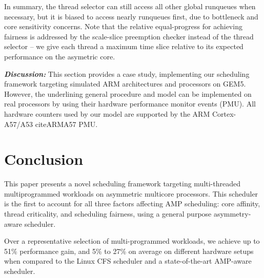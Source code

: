 \documentclass{sig-alternate}
\begin{document}
In summary, the thread selector can still access all other global runqueues when necessary, but it is biased to access nearly runqueues first, due to bottleneck and core sensitivity concerns. 
Note that the relative equal-progress for achieving fairness is addressed by the scale-slice preemption checker instead of the thread selector -- we give each thread a maximum time slice relative to its expected performance on the asymetric core.

\textbf{\textit{Discussion:}}
This section provides a case study, implementing our scheduling framework targeting simulated ARM architectures and processors on GEM5.  However, the underlining general procedure and model can be implemented on real processors by using their hardware performance monitor events (PMU). All hardware counters used by our model are supported by the ARM Cortex-A57/A53 cite{ARMA57} PMU.


\vspace{10mm}
\section{Conclusion}
This paper presents a novel scheduling framework targeting multi-threaded multiprogrammed workloads on asymmetric multicore processors. This scheduler is the first to account for all three factors affecting AMP scheduling: core affinity, thread criticality, and scheduling fairness, using a general purpose asymmetry-aware scheduler.

Over a representative selection of multi-programmed workloads, we achieve up to 51\% performance gain, and 5\% to 27\% on average on different hardware setups when compared to the Linux CFS scheduler and a state-of-the-art AMP-aware scheduler.



\end{document}
